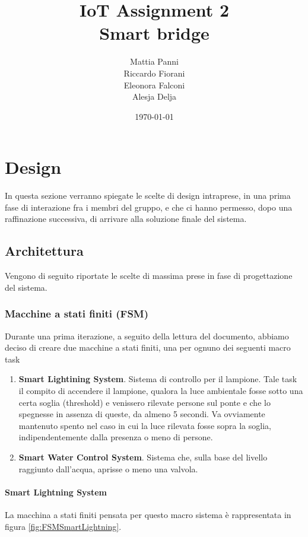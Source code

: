 \documentclass[a4paper,12pt]{report}
\title{%
  IoT Assignment 2 \\
  \large Smart bridge}
\author{Mattia Panni \\ Riccardo Fiorani \\ Eleonora Falconi \\ Alesja Delja}
\date{\today}
\begin{document}
\maketitle
\tableofcontents


\chapter{Design}
In questa sezione verranno spiegate le scelte di design intraprese, in una prima fase di interazione fra i membri del gruppo, e che ci hanno permesso, dopo una raffinazione successiva, di arrivare alla soluzione finale del sistema.
\section{Architettura}
Vengono di seguito riportate le scelte di massima prese in fase di progettazione del sistema.
\subsection{Macchine a stati finiti (FSM)}
Durante una prima iterazione, a seguito della lettura del documento, abbiamo deciso di creare due macchine a stati finiti, una per ognuno dei seguenti macro task
\begin{enumerate}
    \item \textbf{Smart Lightining System}. Sistema di controllo per il lampione. Tale task il compito di accendere il lampione, qualora la luce ambientale fosse sotto una certa soglia (threshold) e venissero rilevate persone sul ponte e che lo spegnesse in assenza di queste, da almeno 5 secondi. Va ovviamente mantenuto spento nel caso in cui la luce rilevata fosse sopra la soglia, indipendentemente dalla presenza o meno di persone.
    \item \textbf{Smart Water Control System}. Sistema che, sulla base del livello raggiunto dall'acqua, aprisse o meno una valvola.
\end{enumerate}
\subsubsection{Smart Lightning System}
La macchina a stati finiti pensata per questo macro sistema è rappresentata in figura \ref{fig:FSMSmartLightning}.
\end{document}
